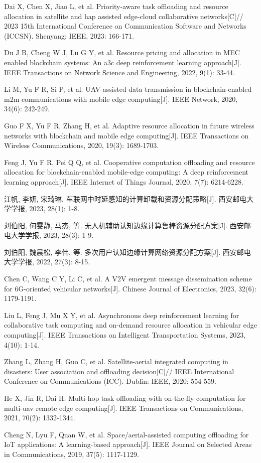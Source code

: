 \begin{reflist}
\item[{[10]}] Dai X, Chen X, Jiao L, et al. Priority-aware task offloading and
  resource allocation in satellite and hap assisted edge-cloud collaborative
  networks[C]// 2023 15th International Conference on Communication Software and
  Networks (ICCSN). Shenyang: IEEE, 2023: 166-171.
\item[{[11]}] Du J B, Cheng W J, Lu G Y, et al. Resource pricing and allocation
  in MEC enabled blockchain systems: An a3c deep reinforcement learning
  approach[J]. IEEE Transactions on Network Science and Engineering, 2022, 9(1):
  33-44.
\item[{[12]}] Li M, Yu F R, Si P, et al. UAV-assisted data transmission in
  blockchain-enabled m2m communications with mobile edge computing[J]. IEEE
  Network, 2020, 34(6): 242-249.
\item[{[13]}] Guo F X, Yu F R, Zhang H, et al. Adaptive resource allocation in
  future wireless networks with blockchain and mobile edge computing[J]. IEEE
  Transactions on Wireless Communications, 2020, 19(3): 1689-1703.
\item[{[14]}] Feng J, Yu F R, Pei Q Q, et al. Cooperative computation offloading
  and resource allocation for blockchain-enabled mobile-edge computing: A deep
  reinforcement learning approach[J]. IEEE Internet of Things Journal, 2020,
  7(7): 6214-6228.
\item[{[15]}] 江帆, 李妍, 宋琦琳. 车联网中时延感知的计算卸载和资源分配策略[J].
  西安邮电大学学报, 2023, 28(1): 1-8.
\item[{[16]}] 刘伯阳, 何雯静, 马杰, 等. 无人机辅助认知边缘计算鲁棒资源分配方案[J].
  西安邮电大学学报, 2023, 28(3): 1-9.
\item[{[17]}] 刘伯阳, 魏晨松, 李伟, 等. 多次用户认知边缘计算网络资源分配方案[J].
  西安邮电大学学报, 2022, 27(3): 8-15.
\item[{[18]}] Chen C, Wang C Y, Li C, et al. A V2V emergent message dissemination
  scheme for 6G-oriented vehicular networks[J]. Chinese Journal of Electronics,
  2023, 32(6): 1179-1191.
\item[{[19]}] Liu L, Feng J, Mu X Y, et al. Asynchronous deep reinforcement
  learning for collaborative task computing and on-demand resource allocation in
  vehicular edge computing[J]. IEEE Transactions on Intelligent Transportation
  Systems, 2023, 4(10): 1-14.
\item[{[20]}] Zhang L, Zhang H, Guo C, et al. Satellite-aerial integrated
  computing in disasters: User association and offloading decision[C]// IEEE
  International Conference on Communications (ICC). Dublin: IEEE, 2020: 554-559.
\item[{[21]}] He X, Jin R, Dai H. Multi-hop task offloading with on-the-fly
  computation for multi-uav remote edge computing[J]. IEEE Transactions on
  Communications, 2021, 70(2): 1332-1344.
\item[{[22]}] Cheng N, Lyu F, Quan W, et al. Space/aerial-assisted computing
  offloading for IoT applications: A learning-based approach[J]. IEEE Journal on
  Selected Areas in Communications, 2019, 37(5): 1117-1129.
\end{reflist}
